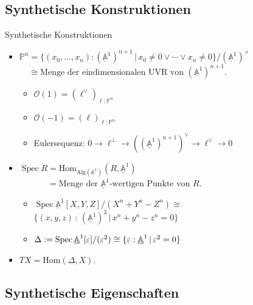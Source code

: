 \documentclass[12pt,utf8,notheorems,compress,t]{beamer}
\renewcommand{\AA}{\mathbb{A}}
\renewcommand{\O}{\mathcal{O}}
\newcommand{\defeq}{\vcentcolon=}
\newcommand{\Hom}{\mathrm{Hom}}
\newcommand{\RelSpec}{\operatorname{Spec}}
\renewcommand{\_}{\mathpunct{.}}
\newcommand{\?}{\,{:}\,}
\newcommand{\ull}[1]{\underline{#1}}
\newcommand{\affl}{\ensuremath{{\ull{\AA}^1}}}
\begin{document}
\subsection{Synthetische Konstruktionen}

\begin{frame}{Synthetische Konstruktionen}
  \begin{itemize}
  \item $\mathbb{P}^n = \{ (x_0,\ldots,x_n) : (\affl)^{n+1} \,|\,
    x_0 \neq 0 \vee \cdots \vee x_n \neq 0 \}/(\affl)^\times$ \\
  $\phantom{\mathbb{P}^n} \cong \text{Menge der eindimensionalen UVR von~$(\affl)^{n+1}$}$.

  \begin{itemize}
    \item $\O(1) = (\ell^\vee)_{\ell : \mathbb{P}^n}$
    \item $\O(-1) = (\ell)_{\ell : \mathbb{P}^n}$
    \item Eulersequenz: $0 \to \ell^\perp \to ((\affl)^{n+1})^\vee \to \ell^\vee \to 0$
  \end{itemize}\bigskip

  \item $\RelSpec R = \Hom_{\mathrm{Alg}(\affl)}(R, \affl)$ \\
  $\phantom{\RelSpec R} = \text{Menge der $\affl$-wertigen Punkte von $R$}.$

  \begin{itemize}
    \item $\RelSpec \affl[X,Y,Z]/(X^n+Y^n-Z^n) \cong {}$ \\ \qquad\qquad $\{ (x,y,z) \? (\affl)^3 \,|\, x^n+y^n-z^n = 0 \}$ \medskip
    \item $\Delta \defeq \RelSpec \affl[\varepsilon]/(\varepsilon^2) \cong \{ \varepsilon : \affl \,|\, \varepsilon^2 = 0 \}$
  \end{itemize}\bigskip

  \item $TX = \Hom(\Delta, X)$.
  \end{itemize}
\end{frame}


\subsection{Synthetische Eigenschaften}
\end{document}
